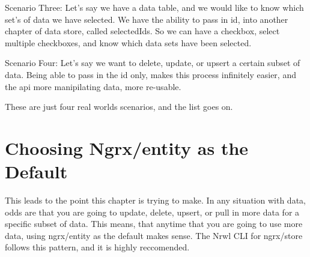Scenario Three:
Let's say we have a data table, and we would like to know which set's of data
we have selected. We have the ability to pass in id, into another chapter of
data store, called selectedIds. So we can have a checkbox, select multiple
checkboxes, and know which data sets have been selected.

Scenario Four:
Let's say we want to delete, update, or upsert a certain subset of data. Being
able to pass in the id only, makes this process infinitely easier, and the api
more manipilating data, more re-usable.

These are just four real worlds scenarios, and the list goes on.

\section{Choosing Ngrx/entity as the Default}
This leads to the point this chapter is trying to make. In any situation with
data, odds are that you are going to update, delete, upsert, or pull in more
data for a specific subset of data. This means, that anytime that you are going
to use more data, using ngrx/entity as the default makes sense. The Nrwl CLI
for ngrx/store follows this pattern, and it is highly reccomended.
